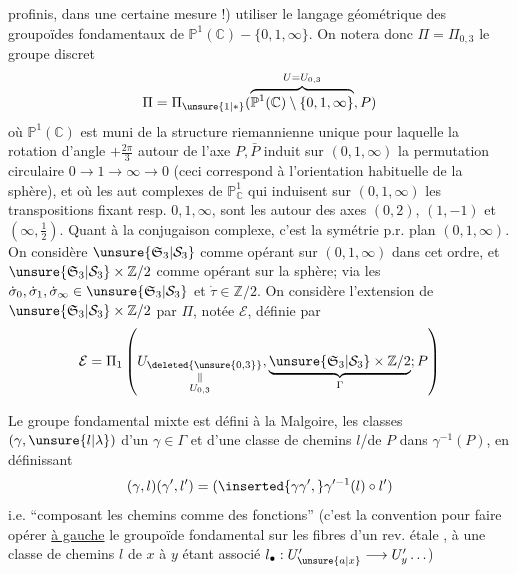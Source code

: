 profinis, dans une certaine mesure !) utiliser le langage géométrique des groupoïdes fondamentaux de $\mathbb P^1(\mathbb C)-\{0,1,\infty\}$. On  notera donc $\Pi=\Pi_{0,3}$ le groupe discret
\[
\Pi=\Pi_{\unsure{1|*}}(\overbrace{\mathbb P^1(\mathbb C)\setminus\{0,1,\infty\}}^{U=U_{0,3}},P)
\]
où $\mathbb P^1(\mathbb C)$ est muni de la structure  riemannienne  unique pour laquelle la rotation \inserted{$\dot\rho$} d'angle $+\frac{2\pi}{3}$ autour de l'axe $P,\bar P$  induit sur $(0,1,\infty)$ la permutation circulaire $0\longrightarrow1\longrightarrow\infty\longrightarrow0$ (ceci correspond à l'orientation habituelle de la sphère), et où les aut complexes  de $\mathbb P^1_{\mathbb C}$ qui   induisent  sur $(0,1,\infty)$ les transpositions fixant resp. $0,1,\infty$, sont  les   autour des axes  $(0,2)$, $(1,-1)$ et $(\infty,\frac12)$.
Quant à la conjugaison complexe, c'est la symétrie p.r.  plan $(0,1,\infty)$. On considère $\unsure{\mathfrak S_3|\mathcal S_3}$ comme opérant sur $(0,1,\infty)$ dans cet ordre, et $\unsure{\mathfrak S_3|\mathcal S_3}\times\mathbb Z/2$ comme opérant sur la sphère; via les $\dot\sigma_0,\dot\sigma_1,\dot\sigma_\infty\in\unsure{\mathfrak S_3|\mathcal S_3}$ et $\dot\tau\in\mathbb Z/2$. On considère l'extension  de $\unsure{\mathfrak S_3|\mathcal S_3}\times\mathbb Z/2$ par $\Pi$, notée  $\mathcal E$, définie par
\[
\mathcal E=\Pi_1\left(\underset{\substack{\Vert\\U_{0,3}}}{U_{\deleted{\unsure{0,3}}}},\underbrace{\unsure{\mathfrak S_3|\mathcal S_3}\times\mathbb Z/2}_{\Gamma};P\right)
\]

Le groupe fondamental mixte est défini à la Malgoire,  les classes $(\gamma,\unsure{l|\lambda})$ d'un $\gamma\in\Gamma$ et d'une classe de chemins $l$/de $P$ dans $\gamma^{-1}(P)$, en définissant
\[
(\gamma,l)(\gamma',l')=(\inserted{\gamma\gamma',}\gamma'^{-1}(l)\circ l')
\]
i.e. ``composant les chemins comme des fonctions'' (c'est la convention pour faire opérer \uline{à gauche} le groupoïde fondamental sur les fibres d'un rev. étale , à une classe de chemins $l$ de $x$ à $y$ étant associé $l_\bullet:U'_{\unsure{a|x}}\longrightarrow U'_y\ldots$)

